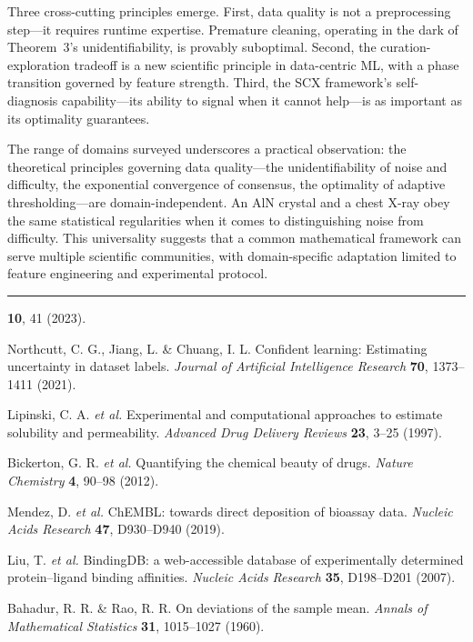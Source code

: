 \documentclass[twocolumn]{article}
\theoremstyle{definition}
\begin{document}
Three cross-cutting principles emerge. First, data quality is not a preprocessing step---it requires runtime expertise. Premature cleaning, operating in the dark of Theorem~3's unidentifiability, is provably suboptimal. Second, the curation-exploration tradeoff is a new scientific principle in data-centric ML, with a phase transition governed by feature strength. Third, the SCX framework's self-diagnosis capability---its ability to signal when it cannot help---is as important as its optimality guarantees.

The range of domains surveyed underscores a practical observation: the theoretical principles governing data quality---the unidentifiability of noise and difficulty, the exponential convergence of consensus, the optimality of adaptive thresholding---are domain-independent. An AlN crystal and a chest X-ray obey the same statistical regularities when it comes to distinguishing noise from difficulty. This universality suggests that a common mathematical framework can serve multiple scientific communities, with domain-specific adaptation limited to feature engineering and experimental protocol.

\begin{center}
\rule{0.5\textwidth}{0.5pt}
\end{center}

\textbf{10}, 41 (2023).

Northcutt, C. G., Jiang, L. \& Chuang, I. L. Confident learning: Estimating uncertainty in dataset labels. \emph{Journal of Artificial Intelligence Research} \textbf{70}, 1373--1411 (2021).

Lipinski, C. A. \emph{et al.} Experimental and computational approaches to estimate solubility and permeability. \emph{Advanced Drug Delivery Reviews} \textbf{23}, 3--25 (1997).

Bickerton, G. R. \emph{et al.} Quantifying the chemical beauty of drugs. \emph{Nature Chemistry} \textbf{4}, 90--98 (2012).

Mendez, D. \emph{et al.} ChEMBL: towards direct deposition of bioassay data. \emph{Nucleic Acids Research} \textbf{47}, D930--D940 (2019).

Liu, T. \emph{et al.} BindingDB: a web-accessible database of experimentally determined protein--ligand binding affinities. \emph{Nucleic Acids Research} \textbf{35}, D198--D201 (2007).

Bahadur, R. R. \& Rao, R. R. On deviations of the sample mean. \emph{Annals of Mathematical Statistics} \textbf{31}, 1015--1027 (1960).
\end{document}
